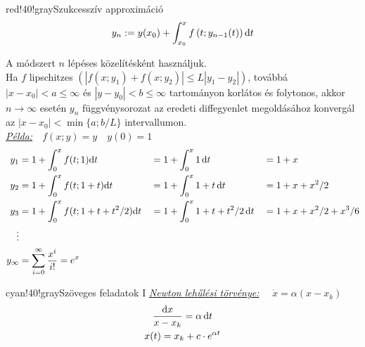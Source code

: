 \documentclass[main.tex]{subfiles}
\begin{document}
\begin{cbox}{red!40!gray}{Szukcesszív approximáció}
  \[
    y_n := y(x_0) + \int_{x_0}^x f \left(
    t; y_{n-1}(t)
    \right) \mathrm{d} t
  \]

  A módszert $n$ lépéses közelítésként használjuk.
  \\[2mm]
  Ha $f$ lipschitzes $\left(|f(x; y_1) + f(x; y_2)| \leq
    L |y_1 - y_2|\right)$, továbbá $|x-x_0|<a\leq\infty$
  és $|y-y_0|<b\leq\infty$ tartományon korlátos és
  folytonos, akkor $n \rightarrow \infty$ esetén $y_n$
  függvénysorozat az eredeti diffegyenlet megoldásához
  konvergál az $|x - x_0| < \min \{a; b/L\}$ intervallumon.
  \\[2mm]
  \emph{\underline{Példa:}}$\quad f(x; y) = y \quad y(0) = 1$
  \begin{alignat*}{3}
    y_1
     & = 1 + \int_0^x f(t; 1) \mathrm{d} t
     &                                                & = 1 + \int_0^x 1 \, \mathrm{d} t
     &                                                & = 1 + x
    \\
    y_2
     & = 1 + \int_0^x f(t; 1+t) \mathrm{d} t
     &                                                & = 1 + \int_0^x 1+t \, \mathrm{d} t
     &                                                & = 1 + x + x^2/2
    \\
    y_3
     & = 1 + \int_0^x f(t; 1+t+t^2/2) \mathrm{d} t
     &                                                & = 1 + \int_0^x 1+t+t^2/2 \, \mathrm{d} t
     &                                                & = 1 + x + x^2/2 + x^3/6
    \\
    \vdots
     &
    \\
    y_\infty
     & = \sum_{i=0}^\infty \frac{x^i}{i!} = e^x
  \end{alignat*}
\end{cbox}



\begin{cbox}{cyan!40!gray}{Szöveges feladatok I}
  \emph{\underline{Newton lehűlési törvénye:}}
  $\quad \dot{x} = \alpha(x - x_k)$
  \begin{gather*}
    \frac{\mathrm{d} x}{x - x_k} = \alpha \, \mathrm{d} t
    \\
    x(t) = x_k + c \cdot e^{\alpha t}
  \end{gather*}

\end{cbox}
\end{document}

